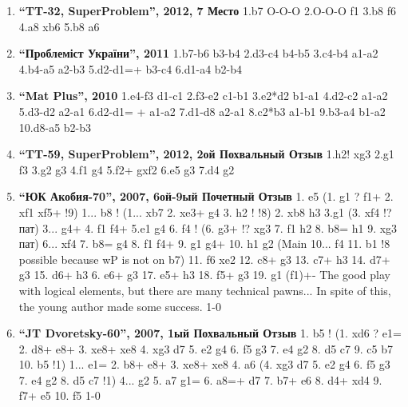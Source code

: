 \begin{enumerate}
\item \textbf{ ``TT-32, SuperProblem'', 2012, 7 Место} 1.\knight{}b7 O-O-O 2.O-O-O \rook{}f1 3.\king{}b8 \rook{}f6 4.\king{}a8 \rook{}xb6 5.\rook{}b8 \rook{}a6\mate{}

\item \textbf{ ``Проблеміст України'', 2011 } 1.b7-b6 b3-b4   2.\king{}d3-c4 b4-b5 3.\king{}c4-b4 \king{}a1-a2   4.\king{}b4-a5 \king{}a2-b3 5.d2-d1=\bishop{}+ \king{}b3-c4   6.\bishop{}d1-a4 b2-b4\mate{}

\item \textbf{ ``Mat Plus'', 2010 } 1.\king{}e4-f3 \king{}d1-c1   2.\king{}f3-e2 \king{}c1-b1   3.\king{}e2*d2 \king{}b1-a1   4.\king{}d2-c2 \king{}a1-a2   5.d3-d2 \king{}a2-a1   6.d2-d1=\queen{} + \king{}a1-a2   7.\queen{}d1-d8 \king{}a2-a1   8.\king{}c2*b3 \king{}a1-b1   9.\king{}b3-a4 \king{}b1-a2  10.\queen{}d8-a5 b2-b3 \mate{}

\item \textbf{ ``TT-59, SuperProblem'', 2012, 2ой Похвальный Отзыв } 1.\rook{}h2! \king{}xg3 2.\king{}g1 \king{}f3 3.\rook{}g2 g3 4.\king{}f1 g4 5.\rook{}f2+ gxf2 6.\queen{}e5 g3 7.\queen{}d4 g2\mate{}

\item \textbf{ ``ЮК Акобия-70'', 2007, 6ой-9ый Почетный Отзыв } 1. \queen{}e5 
(1. \king{}g1 ? \rook{}f1+ 2. \king{}xf1 \queen{}xf5+ !9) 
1... \queen{}b8 !
(1... \queen{}xb7 2. \queen{}xe3+ \king{}g4 3. \king{}h2 ! !8) 
2. \queen{}xb8 \king{}h3 3.\king{}g1 
(3. \queen{}xf4 !? {пат}) 
3... \rook{}g4+ 4. \king{}f1 \rook{}f4+ 5.\king{}e1 \rook{}g4 6. \queen{}f4 ! 
(6. \queen{}g3+ !? \rook{}xg3 7. \king{}f1 \king{}h2 8. b8=\queen{} \king{}h1 9. \queen{}xg3 { пат}) 
6... \rook{}xf4 7. b8=\queen{} \rook{}g4 8. \king{}f1 \rook{}f4+ 9. \king{}g1 \rook{}g4+ 10. \king{}h1 \rook{}g2 
({Main} 10... \rook{}f4 11. \queen{}b1 !8 {possible because wP is not on b7}) 
11. f6 \rook{}xe2 12. \queen{}c8+ \king{}g3 13. \queen{}c7+ \king{}h3 14. \queen{}d7+ \king{}g3 15. \queen{}d6+ \king{}h3 6. \queen{}e6+ \king{}g3 17. \queen{}e5+ \king{}h3 18. \queen{}f5+ \king{}g3 19. \king{}g1 {(\queen{}f1)+- The good play with logical elements, but there are many technical pawns... In spite of this, the young author made some success.} 1-0

\item \textbf{ ``JT Dvoretsky-60'', 2007, 1ый Похвальный Отзыв } 1. \rook{}b5 ! (1. \rook{}xd6 ? e1=\queen{} 2. \rook{}d8+ \queen{}e8+ 3. \rook{}xe8+ \king{}xe8 4. \knight{}xg3 \king{}d7 5. \knight{}e2 g4 6. \king{}f5 g3 7. \king{}e4 g2 8. \king{}d5 \king{}c7 9. \king{}c5 \king{}b7 10. \king{}b5 !1) 1... e1=\queen{} 2. \rook{}b8+ \queen{}e8+ 3. \rook{}xe8+ \king{}xe8 4. a6 (4. \knight{}xg3 \king{}d7 5. \knight{}e2 g4 6. \king{}f5 g3 7. \king{}e4 g2 8. \king{}d5 \king{}c7 !1) 4... g2 5. a7 g1=\queen{} 6. a8=\queen{}+ \king{}d7 7. \queen{}b7+ \king{}e6 8. \knight{}d4+ \queen{}xd4 9. \queen{}f7+ \king{}e5 10. \queen{}f5\mate{} 1-0


\end{enumerate}

